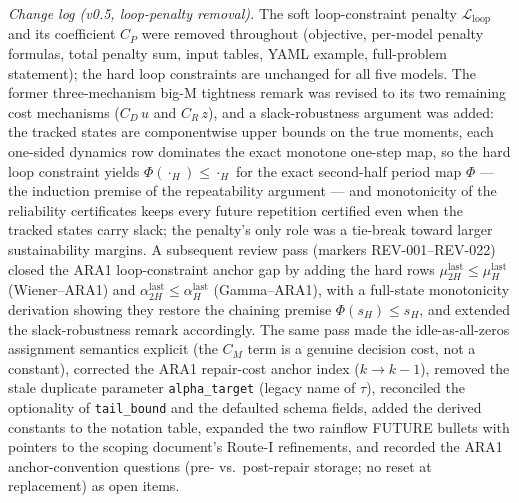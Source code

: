 \emph{Change log (v0.5, loop-penalty removal).}
The soft loop-constraint penalty $\mathcal{L}_{\mathrm{loop}}$ and its
coefficient $C_P$ were removed throughout (objective, per-model penalty
formulas, total penalty sum, input tables, YAML example, full-problem
statement); the hard loop constraints are unchanged for all five models. The
former three-mechanism big-M tightness remark was revised to its two remaining
cost mechanisms ($C_D\,u$ and $C_R\,z$), and a slack-robustness argument was
added: the tracked states are componentwise upper bounds on the true moments,
each one-sided dynamics row dominates the exact monotone one-step map, so the
hard loop constraint yields $\Phi(\cdot_H) \leq \cdot_H$ for the exact
second-half period map $\Phi$ --- the induction premise of the repeatability
argument --- and monotonicity of the reliability certificates keeps every
future repetition certified even when the tracked states carry slack; the
penalty's only role was a tie-break toward larger sustainability margins.
A subsequent review pass (markers REV-001--REV-022) closed the ARA1
loop-constraint anchor gap by adding the hard rows
$\mu^{\mathrm{last}}_{2H} \leq \mu^{\mathrm{last}}_{H}$ (Wiener--ARA1) and
$\alpha^{\mathrm{last}}_{2H} \leq \alpha^{\mathrm{last}}_{H}$ (Gamma--ARA1),
with a full-state monotonicity derivation showing they restore the chaining
premise $\Phi(s_H) \leq s_H$, and extended the slack-robustness remark
accordingly. The same pass made the idle-as-all-zeros assignment semantics
explicit (the $C_M$ term is a genuine decision cost, not a constant),
corrected the ARA1 repair-cost anchor index ($k \to k{-}1$), removed the
stale duplicate parameter \texttt{alpha\_target} (legacy name of $\tau$),
reconciled the optionality of \texttt{tail\_bound} and the defaulted schema
fields, added the derived constants to the notation table, expanded the two
rainflow FUTURE bullets with pointers to the scoping document's Route-I
refinements, and recorded the ARA1 anchor-convention questions (pre- vs.\
post-repair storage; no reset at replacement) as open items.
